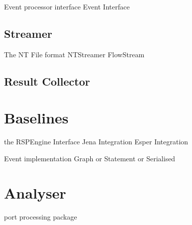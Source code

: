 Event processor interface
Event Interface

\subsection{Streamer}

The NT File format
NTStreamer
FlowStream

\subsection{Result Collector} 

\section{Baselines}\label{sec:baselines-impl}

the RSPEngine Interface
Jena Integration
Esper Integration

Event implementation Graph or Statement or Serialised

\section{Analyser}\label{sec:analyser-impl}

port processing package



